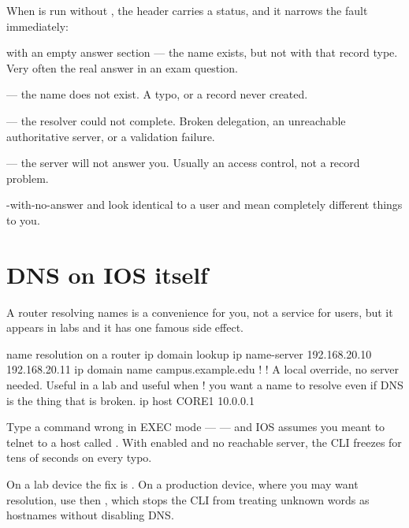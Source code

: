 \begin{examnote}
When  is run without , the header carries a status,
and it narrows the fault immediately:

\begin{tight}
  \item {} with an empty answer section --- the name exists, but not
        with that record type. Very often the real answer in an exam question.
  \item {} --- the name does not exist. A typo, or a record never
        created.
  \item {} --- the resolver could not complete. Broken delegation,
        an unreachable authoritative server, or a validation failure.
  \item {} --- the server will not answer you. Usually an access
        control, not a record problem.
\end{tight}

-with-no-answer and  look identical to a user and mean
completely different things to you.
\end{examnote}

\section{DNS on IOS itself}

A router resolving names is a convenience for you, not a service for users, but
it appears in labs and it has one famous side effect.

\begin{config}{name resolution on a router}
ip domain lookup
ip name-server 192.168.20.10 192.168.20.11
ip domain name campus.example.edu
!
! A local override, no server needed. Useful in a lab and useful when
! you want a name to resolve even if DNS is the thing that is broken.
ip host CORE1 10.0.0.1
\end{config}

\begin{alertbox}
Type a command wrong in EXEC mode ---  --- and IOS assumes you
meant to telnet to a host called . With  enabled
and no reachable server, the CLI freezes for tens of seconds on every typo.

On a lab device the fix is . On a production device,
where you may want resolution, use  then
, which stops the CLI from treating unknown words
as hostnames without disabling DNS.
\end{alertbox}


